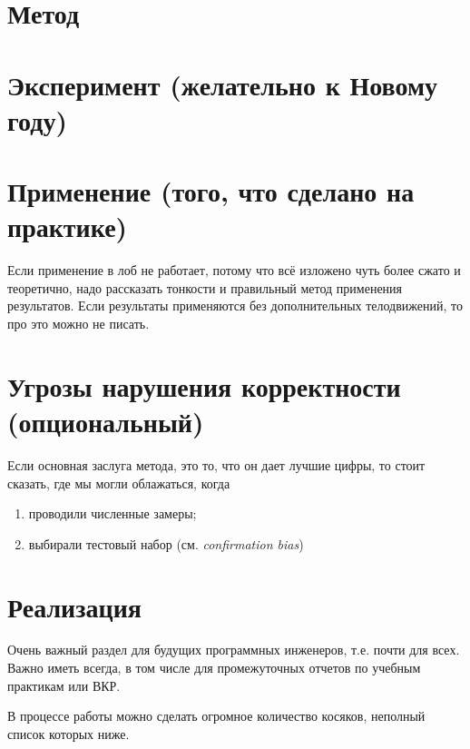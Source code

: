 \section{Метод}



\section{Эксперимент (желательно к Новому году)}


\section{Применение (того, что сделано на практике)}

Если применение в лоб не работает, потому что всё изложено чуть более сжато и теоретично, надо рассказать тонкости и правильный метод применения результатов. Если результаты применяются без до\-полнительных телодвижений, то про это можно не писать.

\section{Угрозы нарушения корректности (опциональный)}

Если основная заслуга метода, это то, что он дает лучшие цифры, то стоит сказать, где мы могли облажаться, когда
\begin{enumerate}
\item проводили численные замеры;
\item выбирали тестовый набор (см. \emph{confirmation bias})
\end{enumerate}

\section{Реализация}
Очень важный раздел для будущих программных инженеров, т.е. почти для всех. Важно иметь всегда, в том числе для промежуточных отчетов по учебным практикам или ВКР.

В процессе работы можно сделать огромное количество косяков, неполный список которых ниже.

